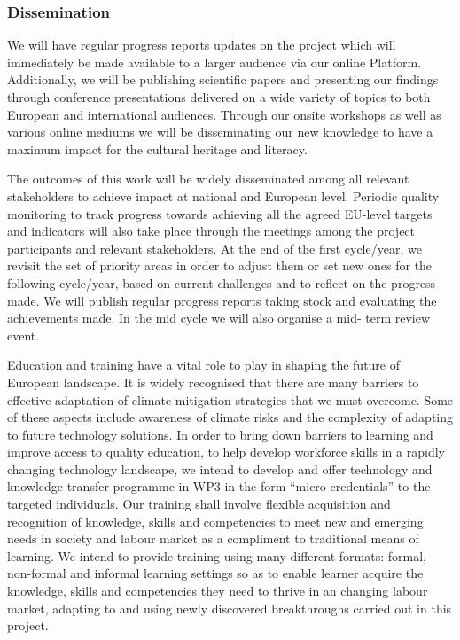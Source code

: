 \subsubsection{Dissemination}
We will have regular progress reports updates on the project which will immediately be made available to a larger audience via our online Platform. Additionally, we will be publishing scientific papers and presenting our findings through conference presentations delivered on a wide variety of topics to both European and international audiences. Through our onsite workshops as well as various online mediums we will be disseminating our new knowledge to have a maximum impact for the cultural heritage and literacy.

The outcomes of this work will be widely disseminated among all relevant stakeholders  to achieve impact at national and European level. Periodic quality monitoring to track progress towards achieving all the agreed EU-level targets and indicators will also take place through the meetings among the project participants and relevant stakeholders. At the end of the first cycle/year, we revisit the set of priority areas in order to adjust them or set new ones for the following cycle/year, based on current challenges and to reflect on the progress made. We will publish regular progress reports taking stock and evaluating the achievements made. In the mid cycle we will also organise a mid- term review event.

Education and training have a vital role to play in shaping the future of European landscape. It is widely recognised that there are many barriers to effective adaptation of climate mitigation strategies that we must overcome. Some of these aspects include awareness of climate risks and the complexity of adapting to future technology solutions. In order to bring down barriers to learning and improve access to quality education, to help develop workforce skills in a rapidly changing technology landscape, we intend to develop and offer technology and knowledge transfer programme in WP3 in the form ``micro-credentials'' to the targeted individuals. Our training shall involve flexible acquisition and recognition of knowledge, skills and competencies to meet new and emerging needs in society and labour market as a compliment to traditional means of learning. We intend to provide training using many different formats: formal, non-formal and informal learning settings so as to enable learner acquire the knowledge, skills and competencies they need to thrive in an changing labour market, adapting to and using newly discovered breakthroughs carried out in this project.


